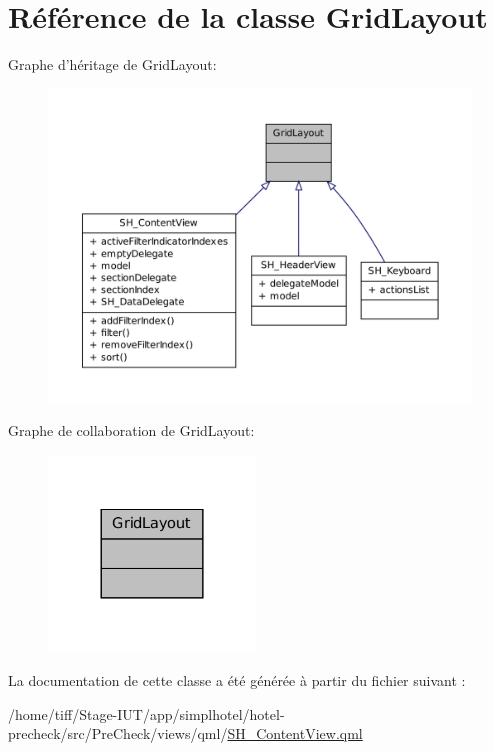 \hypertarget{classGridLayout}{\section{Référence de la classe Grid\-Layout}
\label{classGridLayout}
}


Graphe d'héritage de Grid\-Layout\-:\nopagebreak
\begin{figure}[H]
\begin{center}
\leavevmode
\includegraphics[width=350pt]{classGridLayout__inherit__graph}
\end{center}
\end{figure}


Graphe de collaboration de Grid\-Layout\-:\nopagebreak
\begin{figure}[H]
\begin{center}
\leavevmode
\includegraphics[width=156pt]{classGridLayout__coll__graph}
\end{center}
\end{figure}


La documentation de cette classe a été générée à partir du fichier suivant \-:\begin{DoxyCompactItemize}
\item 
/home/tiff/\-Stage-\/\-I\-U\-T/app/simplhotel/hotel-\/precheck/src/\-Pre\-Check/views/qml/\hyperlink{SH__ContentView_8qml}{S\-H\-\_\-\-Content\-View.\-qml}\end{DoxyCompactItemize}
